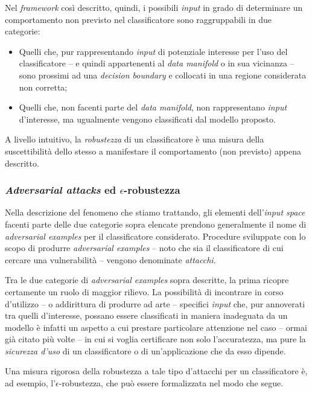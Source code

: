\documentclass[a4paper, twoside]{article}
\begin{document}
Nel \textit{framework} così descritto, quindi, i possibili \textit{input} in grado di determinare un comportamento non previsto nel classificatore sono raggruppabili in due categorie:

\begin{itemize}
	\item {Quelli che, pur rappresentando \textit{input} di potenziale interesse per l'uso del classificatore -- e quindi appartenenti al \textit{data manifold} o in sua vicinanza -- sono prossimi ad una \textit{decision boundary} e collocati in una regione considerata non corretta;}
	\item {Quelli che, non facenti parte del \textit{data manifold}, non rappresentano \textit{input} d'interesse, ma ugualmente vengono classificati dal modello proposto}.
\end{itemize}

A livello intuitivo, la \textit{robustezza} di un classificatore è una misura della suscettibilità dello stesso a manifestare il comportamento (non previsto) appena descritto.

\subsubsection{\textit{Adversarial attacks} ed $\epsilon$-robustezza}

Nella descrizione del fenomeno che stiamo trattando, gli elementi dell'\textit{input space} facenti parte delle due categorie sopra elencate prendono generalmente il nome di \textit{adversarial examples} per il classificatore considerato. Procedure sviluppate con lo scopo di produrre \textit{adversarial examples} -- noto che sia il classificatore di cui cercare una vulnerabilità -- vengono denominate \textit{attacchi}.

Tra le due categorie di \textit{adversarial examples} sopra descritte, la prima ricopre certamente un ruolo di maggior rilievo. La possibilità di incontrare in corso d'utilizzo -- o addirittura di produrre ad arte -- specifici \textit{input} che, pur annoverati tra quelli d'interesse, possano essere classificati in maniera inadeguata da un modello è infatti un aspetto a cui prestare particolare attenzione nel caso -- ormai già citato più volte -- in cui si voglia certificare non solo l'accuratezza, ma pure la \textit{sicurezza d'uso} di un classificatore o di un'applicazione che da esso dipende.

Una misura rigorosa della robustezza a tale tipo d'attacchi per un classificatore è, ad esempio, l'$\epsilon$-robustezza, che può essere formalizzata nel modo che segue.
\end{document}
